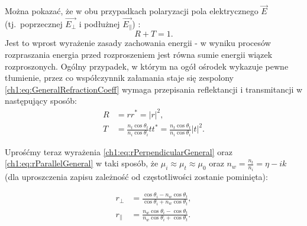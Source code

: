 Można pokazać, że w obu przypadkach polaryzacji pola elektrycznego $\vec{E}$ (tj.~poprzecznej $\vec{E_\perp}$ i podłużnej $\vec{E_\parallel}$) :
\begin{equation}
R + T = 1.
\end{equation}
Jest to wprost wyrażenie zasady zachowania energii - w wyniku procesów rozpraszania energia przed rozproszeniem jest równa sumie energii wiązek rozproszonych.
Ogólny przypadek, w którym na ogół ośrodek wykazuje pewne tłumienie, przez co współczynnik załamania staje się zespolony \eqref{ch1:eq:GeneralRefractionCoeff} wymaga przepisania reflektancji i transmitancji w następujący sposób:
\begin{align}
\label{ch1:eq:ReflectanceGeneral}
R &= rr^* = |r|^2,\\
\label{ch1:eq:TransmitanceGeneral}
T &= \frac{n_t\cos\theta_t}{n_i\cos\theta_i}tt^* = \frac{n_t\cos\theta_t}{n_i\cos\theta_i}|t|^2.
\end{align}

Uprośćmy teraz wyrażenia \eqref{ch1:eq:rPerpendicularGeneral} oraz \eqref{ch1:eq:rParallelGeneral} w taki sposób, że $\mu_i \approx \mu_t \approx \mu_0$ oraz $n_w = \frac{n_t}{n_i}=\eta - ik$ (dla uproszczenia zapisu zależność od częstotliwości zostanie pominięta):

\begin{align}
\label{ch1:eq:SimpleFresnelRperp}
r_\perp &= \frac{\cos\theta_i - n_w\cos\theta_t}{\cos\theta_i + n_w\cos\theta_t},\\
\label{ch1:eq:SimpleFresnelRpara}
r_\parallel &= \frac{n_w\cos\theta_i - \cos\theta_t}{n_w\cos\theta_i + \cos\theta_t}.
\end{align}

